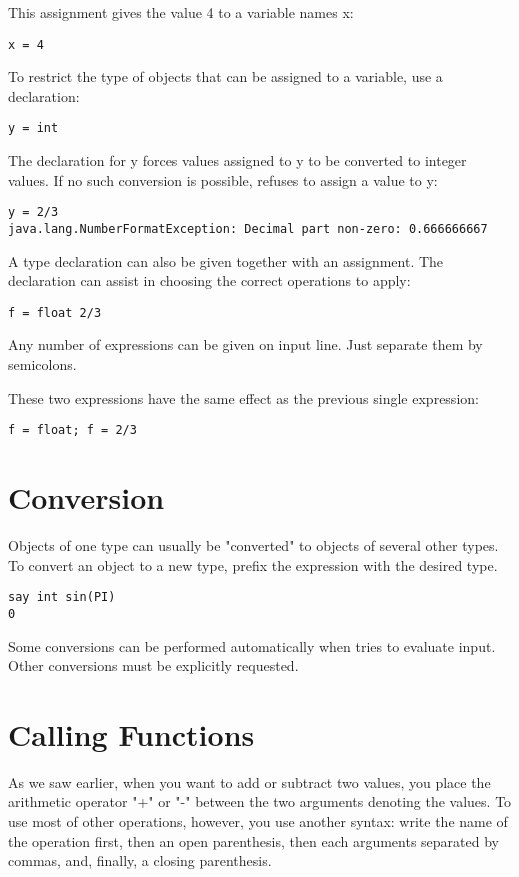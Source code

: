 This assignment gives the value 4 to a variable names x:
\begin{verbatim}
x = 4
\end{verbatim}
To restrict the type of objects that can be assigned to a variable, use a declaration:

\begin{verbatim}
y = int
\end{verbatim}
The declaration for y forces values assigned to y to be converted to integer values. If no such conversion is possible, \nr{} refuses to assign a value to y:

\begin{verbatim}
y = 2/3
java.lang.NumberFormatException: Decimal part non-zero: 0.666666667
\end{verbatim}
A type declaration can also be given together with an assignment. The declaration can assist \nr{} in choosing the correct operations to apply:

\begin{verbatim}
f = float 2/3
\end{verbatim}
Any number of expressions can be given on input line. Just separate them by semicolons.

These two expressions have the same effect as the previous single expression:

\begin{verbatim}
f = float; f = 2/3
\end{verbatim}
 \section{Conversion}

Objects of one type can usually be "converted" to objects of several other types. To convert an object to a new type, prefix the expression with the desired type.
\begin{verbatim}
say int sin(PI)
0
\end{verbatim}
Some conversions can be performed automatically when \nr{} tries to evaluate input. Other conversions must be explicitly requested.

\section{Calling Functions}

As we saw earlier, when you want to add or subtract two values, you place the arithmetic operator "+" or "-" between the two arguments denoting the values. To use most of other \nr{} operations, however, you use another syntax: write the name of the operation first, then an open parenthesis, then each arguments separated by commas, and, finally, a closing parenthesis.

